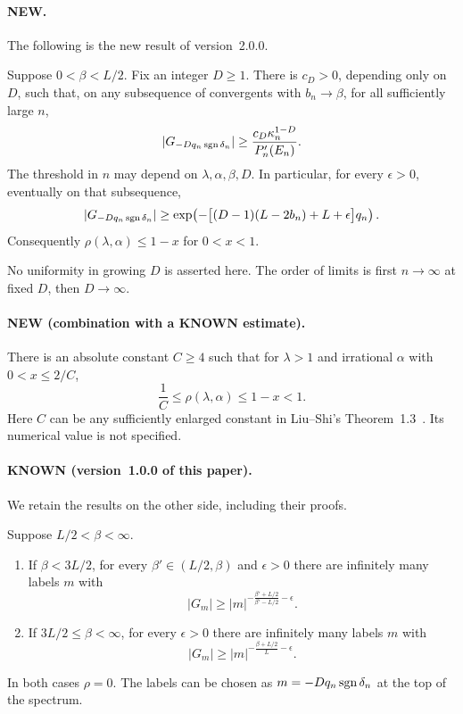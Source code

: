 \paragraph{NEW.}
The following is the new result of version~2.0.0.
\begin{maintheorem}\label{thm:below}
Suppose $0<\beta<L/2$. Fix an integer $D\ge1$. There is $c_D>0$, depending only on $D$, such that, on any subsequence of convergents with $b_n\to\beta$, for all sufficiently large $n$,
\begin{equation}\label{eq:belowwidth}
 |G_{-Dq_n\operatorname{sgn}\delta_n}|
 \ge \frac{c_D\kappa_n^{1-D}}{P_n'(E_n)}.
\end{equation}
The threshold in $n$ may depend on $\lambda,\alpha,\beta,D$. In particular, for every $\epsilon>0$, eventually on that subsequence,
\begin{equation}\label{eq:belowexponential}
 |G_{-Dq_n\operatorname{sgn}\delta_n}|
 \ge \exp\!\left(-\bigl[(D-1)(L-2b_n)+L+\epsilon\bigr]q_n\right).
\end{equation}
Consequently $\rho(\lambda,\alpha)\le1-x$ for $0<x<1$.
\end{maintheorem}
No uniformity in growing $D$ is asserted here. The order of limits is first $n\to\infty$ at fixed $D$, then $D\to\infty$.

\paragraph{NEW (combination with a KNOWN estimate).}
\begin{maincorollary}\label{cor:bracket}
There is an absolute constant $C\ge4$ such that for $\lambda>1$ and irrational $\alpha$ with $0<x\le2/C$,
\[
 \frac1C\le\rho(\lambda,\alpha)\le1-x<1.
\]
Here $C$ can be any sufficiently enlarged constant in Liu--Shi's Theorem~1.3~\cite{LiuShi2019}. Its numerical value is not specified.
\end{maincorollary}

\paragraph{KNOWN (version~1.0.0 of this paper).}
We retain the results on the other side, including their proofs.
\begin{maintheorem}\label{thm:polynomial}
Suppose $L/2<\beta<\infty$.
\begin{enumerate}
\item If $\beta<3L/2$, for every $\beta'\in(L/2,\beta)$ and $\epsilon>0$ there are infinitely many labels $m$ with
\[
 |G_m|\ge |m|^{-\frac{\beta'+L/2}{\beta'-L/2}-\epsilon}.
\]
\item If $3L/2\le\beta<\infty$, for every $\epsilon>0$ there are infinitely many labels $m$ with
\[
 |G_m|\ge |m|^{-\frac{\beta+L/2}{L}-\epsilon}.
\]
\end{enumerate}
In both cases $\rho=0$. The labels can be chosen as $m=-Dq_n\operatorname{sgn}\delta_n$ at the top of the spectrum.
\end{maintheorem}

